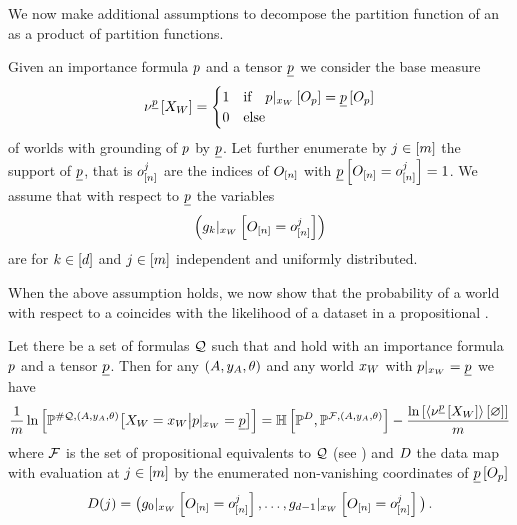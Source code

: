 
We now make additional assumptions to decompose the partition function of an \HybridFOLNetwork{} as a product of \HybridLogicNetwork{} partition functions.

\begin{assumption}
    \label{ass:independentTuples}
    Given an importance formula $p$ and a tensor $\underline{p}$ we consider the base measure
    \begin{align*}
        \nu^{\underline{p}}\left[X_{W}\right]
        = \begin{cases}
              1 & \text{if}\quad {p}|_{x_{W}} \left[O_{p}\right] = \underline{p}\left[O_{p}\right] \\
              0 & \text{else}
        \end{cases}
    \end{align*}
    of worlds with grounding of $p$ by $\underline{p}$.
    Let further enumerate by $j\in[m]$ the support of $\underline{p}$, that is $o_{[n]}^j$ are the indices of $O_{[n]}$ with $\underline{p}\left[O_{[n]}=o_{[n]}^j\right]=1$.
    We assume that with respect to $\underline{p}$ the variables
    \begin{align}
        \left({g_{k}}|_{x_{W}} \left[O_{[n]}=o_{[n]}^j\right]\right)
    \end{align}
    are for $k\in[d]$ and $j\in[m]$ independent and uniformly distributed.
\end{assumption}

When the above assumption holds, we now show that the probability of a \firstOrderLogic{} world with respect to a \HybridFOLNetwork{} coincides with the likelihood of a dataset in a propositional \HybridLogicNetwork{}.

\begin{theorem}
    \label{the:FOLworldToPLdataset}
    Let there be a set of formulas $\mathcal{Q}$ such that  and  hold with an importance formula $p$ and a tensor $\underline{p}$.
    Then for any $(A,y_{A},\theta)$ and any world $x_{W}$ with ${p}|_{x_{W}}=\underline{p}$ we have
    \begin{align*}
        \frac{1}{m} \ln \left[ \mathbb{P}^{\#\mathcal{Q},(A,y_{A},\theta)}\big[X_{W}=x_{W}\big|{p}|_{x_{W}}=\underline{p}\big] \right]
        = \mathbb{H}\left[\mathbb{P}^{D},\mathbb{P}^{\mathcal{F},(A,y_{A},\theta)}\right] -
        \frac{\ln \left[ \left\langle \nu^{\underline{p}}\left[X_{W}\right]\right\rangle \left[ \varnothing \right] \right]}{m}
    \end{align*}
    where $\mathcal{F}$ is the set of propositional equivalents to $\mathcal{Q}$ (see ) and $D$ the data map with evaluation at $j\in[m]$ by the enumerated non-vanishing coordinates of $\underline{p}\left[O_{p}\right]$
    \begin{align*}
        D(j)
        = \big({g_{0}}|_{x_{W}} \left[O_{[n]}=o_{[n]}^j\right],\ldots,{g_{d-1}}|_{x_{W}} \left[O_{[n]}=o_{[n]}^j\right]\big) \, .
    \end{align*}
\end{theorem}

